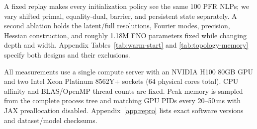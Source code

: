A fixed replay makes every initialization policy see the same 100 PFR NLPs;
we vary shifted primal, equality-dual, barrier, and persistent state separately.
A second ablation holds the latent/full resolutions, Fourier modes, precision,
Hessian construction, and roughly 1.18M FNO parameters fixed while changing
depth and width.  Appendix Tables~\ref{tab:warm-start} and
\ref{tab:topology-memory} specify both designs and their exclusions.

All measurements use a single compute server with an NVIDIA H100 80GB GPU and
two Intel Xeon Platinum 8562Y+ sockets (64 physical cores total).
CPU affinity and BLAS/OpenMP thread counts are fixed.  Peak memory is sampled
from the complete process tree and matching GPU PIDs every 20--50\,ms with JAX
preallocation disabled.  Appendix~\ref{app:repro} lists exact software versions
and dataset/model checksums.
